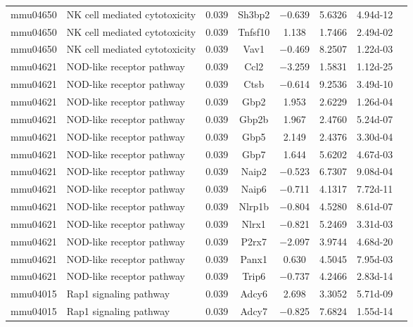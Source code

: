 {\begin{longtable}[l]{cp{4.3cm}cccccc}
mmu04650	& NK cell mediated cytotoxicity	& \num{0.039}	& Sh3bp2	& \num{-0.639}	& \num{ 5.6326}	& \num{4.94d-12}\\ 
mmu04650	& NK cell mediated cytotoxicity	& \num{0.039}	& Tnfsf10	& \num{ 1.138}	& \num{ 1.7466}	& \num{2.49d-02}\\ 
mmu04650	& NK cell mediated cytotoxicity	& \num{0.039}	& Vav1	& \num{-0.469}	& \num{ 8.2507}	& \num{1.22d-03}\\ 
mmu04621	& NOD-like receptor pathway	& \num{0.039}	& Ccl2	& \num{-3.259}	& \num{ 1.5831}	& \num{1.12d-25}\\ 
mmu04621	& NOD-like receptor pathway	& \num{0.039}	& Ctsb	& \num{-0.614}	& \num{ 9.2536}	& \num{3.49d-10}\\ 
mmu04621	& NOD-like receptor pathway	& \num{0.039}	& Gbp2	& \num{ 1.953}	& \num{ 2.6229}	& \num{1.26d-04}\\ 
mmu04621	& NOD-like receptor pathway	& \num{0.039}	& Gbp2b	& \num{ 1.967}	& \num{ 2.4760}	& \num{5.24d-07}\\ 
mmu04621	& NOD-like receptor pathway	& \num{0.039}	& Gbp5	& \num{ 2.149}	& \num{ 2.4376}	& \num{3.30d-04}\\ 
mmu04621	& NOD-like receptor pathway	& \num{0.039}	& Gbp7	& \num{ 1.644}	& \num{ 5.6202}	& \num{4.67d-03}\\ 
mmu04621	& NOD-like receptor pathway	& \num{0.039}	& Naip2	& \num{-0.523}	& \num{ 6.7307}	& \num{9.08d-04}\\ 
mmu04621	& NOD-like receptor pathway	& \num{0.039}	& Naip6	& \num{-0.711}	& \num{ 4.1317}	& \num{7.72d-11}\\ 
mmu04621	& NOD-like receptor pathway	& \num{0.039}	& Nlrp1b	& \num{-0.804}	& \num{ 4.5280}	& \num{8.61d-07}\\ 
mmu04621	& NOD-like receptor pathway	& \num{0.039}	& Nlrx1	& \num{-0.821}	& \num{ 5.2469}	& \num{3.31d-03}\\ 
mmu04621	& NOD-like receptor pathway	& \num{0.039}	& P2rx7	& \num{-2.097}	& \num{ 3.9744}	& \num{4.68d-20}\\ 
mmu04621	& NOD-like receptor pathway	& \num{0.039}	& Panx1	& \num{ 0.630}	& \num{ 4.5045}	& \num{7.95d-03}\\ 
mmu04621	& NOD-like receptor pathway	& \num{0.039}	& Trip6	& \num{-0.737}	& \num{ 4.2466}	& \num{2.83d-14}\\ 
mmu04015	& Rap1 signaling pathway	& \num{0.039}	& Adcy6	& \num{ 2.698}	& \num{ 3.3052}	& \num{5.71d-09}\\ 
mmu04015	& Rap1 signaling pathway	& \num{0.039}	& Adcy7	& \num{-0.825}	& \num{ 7.6824}	& \num{1.55d-14}\\ 

\end{longtable}}

